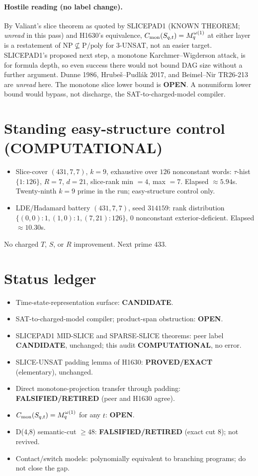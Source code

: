 \documentclass[11pt]{article}
\begin{document}
\paragraph{Hostile reading (no label change).} By Valiant's slice theorem as quoted by SLICEPAD1 (KNOWN THEOREM;
\emph{unread} in this pass) and H1630's equivalence, $C_{\rm mon}(S_{q,t})=M_q^{\omega(1)}$ at either layer is a
restatement of $\mathrm{NP}\not\subseteq\mathrm{P/poly}$ for 3-UNSAT, not an easier target. SLICEPAD1's proposed next
step, a monotone Karchmer--Wigderson attack, is for formula depth, so even success there would not bound DAG size
without a further argument. Dunne 1986, Hrube\v{s}--Pudl\'ak 2017, and Beimel--Nir TR26-213 are \emph{unread} here.
The monotone slice lower bound is \textbf{OPEN}. A nonuniform lower bound would bypass, not discharge, the
SAT-to-charged-model compiler.

\section*{Standing easy-structure control (COMPUTATIONAL)}
\begin{itemize}
\item Slice-cover $(431,7,7)$, $k=9$, exhaustive over $126$ nonconstant words: $\tau$-hist $\{1{:}126\}$, $R=7$, $d=21$,
slice-rank min $=4$, max $=7$. Elapsed $\approx5.94$s. Twenty-ninth $k{=}9$ prime in the run; easy-structure control only.
\item LDE/Hadamard battery $(431,7,7)$, seed $314159$: rank distribution $\{(0,0){:}1,(1,0){:}1,(7,21){:}126\}$,
$0$ nonconstant exterior-deficient. Elapsed $\approx10.30$s.
\end{itemize}
No charged $T$, $S$, or $R$ improvement. Next prime $433$.

\section*{Status ledger}
\begin{itemize}
\item Time-state-representation surface: \textbf{CANDIDATE}.
\item SAT-to-charged-model compiler; product-span obstruction: \textbf{OPEN}.
\item SLICEPAD1 MID-SLICE and SPARSE-SLICE theorems: peer label \textbf{CANDIDATE}, unchanged; this audit \textbf{COMPUTATIONAL}, no error.
\item SLICE-UNSAT padding lemma of H1630: \textbf{PROVED/EXACT} (elementary), unchanged.
\item Direct monotone-projection transfer through padding: \textbf{FALSIFIED/RETIRED} (peer and H1630 agree).
\item $C_{\rm mon}(S_{q,t})=M_q^{\omega(1)}$ for any $t$: \textbf{OPEN}.
\item D(4,8) semantic-cut $\ge48$: \textbf{FALSIFIED/RETIRED} (exact cut 8); not revived.
\item Contact/switch models: polynomially equivalent to branching programs; do not close the gap.
\end{itemize}
\end{document}
